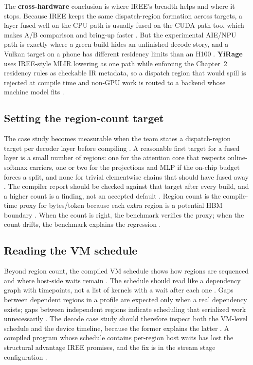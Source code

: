 The \textbf{cross-hardware} conclusion is where IREE's breadth helps and where it stops. Because IREE keeps the same dispatch-region formation across targets, a layer fused well on the CPU path is usually fused on the CUDA path too, which makes A/B comparison and bring-up faster \citep{iree2024}. But the experimental AIE/NPU path is exactly where a green build hides an unfinished decode story, and a Vulkan target on a phone has different residency limits than an H100 \citep{amd2024aie,nvidia2022hopper}. \textbf{YiRage} uses IREE-style MLIR lowering as one path while enforcing the Chapter~2 residency rules as checkable IR metadata, so a dispatch region that would spill is rejected at compile time and non-GPU work is routed to a backend whose machine model fits \citep{yirage2026}.

\subsection{Setting the region-count target}

The case study becomes measurable when the team states a dispatch-region target per decoder layer before compiling \citep{iree2024,taxbreak2026}. A reasonable first target for a fused layer is a small number of regions: one for the attention core that respects online-softmax carriers, one or two for the projections and MLP if the on-chip budget forces a split, and none for trivial elementwise chains that should have fused away \citep{dao2022flashattention,memoryfloor2026}. The compiler report should be checked against that target after every build, and a higher count is a finding, not an accepted default \citep{patel2025llminference,chen2020compilerbasedhardw}. Region count is the compile-time proxy for bytes/token because each extra region is a potential HBM boundary \citep{memoryfloor2026,taxbreak2026}. When the count is right, the benchmark verifies the proxy; when the count drifts, the benchmark explains the regression \citep{iree2024,patel2025llminference}.

\subsection{Reading the VM schedule}

Beyond region count, the compiled VM schedule shows how regions are sequenced and where host-side waits remain \citep{iree2024,taxbreak2026}. The schedule should read like a dependency graph with timepoints, not a list of kernels with a wait after each one \citep{iree2024,nvidia2024cudagraphs}. Gaps between dependent regions in a profile are expected only when a real dependency exists; gaps between independent regions indicate scheduling that serialized work unnecessarily \citep{semianalysis2024tma,memoryfloor2026}. The decode case study should therefore inspect both the VM-level schedule and the device timeline, because the former explains the latter \citep{patel2025llminference,chen2020compilerbasedhardw}. A compiled program whose schedule contains per-region host waits has lost the structural advantage IREE promises, and the fix is in the stream stage configuration \citep{iree2024,taxbreak2026}.

